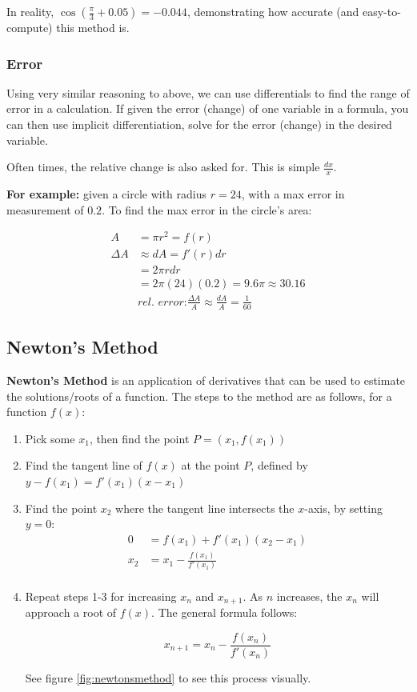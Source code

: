 \documentclass[12pt]{article}
\begin{document}
In reality, $\cos(\frac{\pi}{3}+0.05) = -0.044$, demonstrating how accurate (and easy-to-compute) this method is.

\subsubsection{Error}
Using very similar reasoning to above, we can use differentials to find the range of error in a calculation. If given the error (change) of one variable in a formula, you can then use implicit differentiation, solve for the error (change) in the desired variable.

Often times, the relative change is also asked for. This is simple $\frac{dx}{x}$.

\textbf{For example:} given a circle with radius $r=24$, with a max error in measurement of $0.2$. To find the max error in the circle's area:

\begin{equation}
    \begin{split}
        A &= \pi r^2 = f(r)\\
        \Delta A &\approx dA = f'(r) dr\\
        &= 2\pi r dr\\
        &= 2\pi(24)(0.2) = 9.6 \pi \approx 30.16\\
        &\textit{rel. error:} \frac{\Delta A}{A} \approx \frac{dA}{A} = \frac{1}{60}
    \end{split}
\end{equation}
\subsection{Newton's Method}
\textbf{Newton's Method} is an application of derivatives that can be used to estimate the solutions/roots of a function. The steps to the method are as follows, for a function $f(x)$:

\begin{enumerate}
    \item Pick some $x_1$, then find the point $P = (x_1, f(x_1))$
    \item Find the tangent line of $f(x)$ at the point $P$, defined by $y - f(x_1) = f'(x_1)(x-x_1)$
    \item Find the point $x_2$ where the tangent line intersects the $x$-axis, by setting $y=0$: 
    \begin{equation}
        \begin{split}
            0 &= f(x_1)+f'(x_1)(x_2-x_1)\\
            x_2 &= x_1 - \frac{f(x_1)}{f'(x_1)}\\
        \end{split}
    \end{equation}
    
    \item Repeat steps 1-3 for increasing $x_n$ and $x_{n+1}$. As $n$ increases, the $x_n$ will approach a root of $f(x)$. The general formula follows:
    
    $$x_{n+1} = x_{n} - \frac{f(x_n)}{f'(x_n)}$$
    
    See figure \ref{fig:newtonsmethod} to see this process visually.
\end{enumerate}
\end{document}
